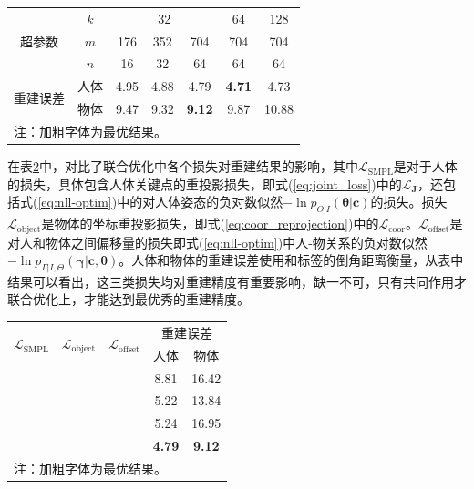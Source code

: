 \begin{table}[!htbp]
	\label{tab:ablation_representation}
	\centering
	\footnotesize
	\setlength{\tabcolsep}{4pt}
	\renewcommand{\arraystretch}{1.2}
	\begin{tabular}{c|c|ccc|c|c}
		\toprule
		\multirow{3}{*}{超参数} & $k$ & \multicolumn{3}{c|}{32} & 64 & 128 \\
		\cline{2-7}
		& $m$ & 176 & 352 & 704 & 704 & 704 \\
		& $n$ & 16 & 32 & 64 & 64 & 64 \\
		\hline
		\multirow{2}{*}{重建误差} & 人体 & 4.95 & 4.88 & 4.79 & \textbf{4.71} & 4.73 \\
		& 物体 & 9.47 & 9.32 & \textbf{9.12} & 9.87 & 10.88 \\
		\bottomrule
		\multicolumn{6}{l}{注：加粗字体为最优结果。}
	\end{tabular}
\end{table}

在表\ref{tab:ablation_loss}中，对比了联合优化中各个损失对重建结果的影响，其中$\mathcal{L}_{\text{SMPL}}$是对于人体的损失，具体包含人体关键点的重投影损失，即式(\ref{eq:joint_loss})中的$\mathcal{L}_{\mathbf{J}}$，还包括式(\ref{eq:nll-optim})中的对人体姿态的负对数似然$-\ln p_{\Theta|I}(\mathbf{\theta}|\mathbf{c})$的损失。损失$\mathcal{L}_{\text{object}}$是物体的坐标重投影损失，即式(\ref{eq:coor_reprojection})中的$\mathcal{L}_{\text{coor}}$。$\mathcal{L}_{\text{offset}}$是对人和物体之间偏移量的损失即式(\ref{eq:nll-optim})中人-物关系的负对数似然$ - \ln p_{\Gamma|I,\Theta}(\mathbf{\gamma}|\mathbf{c}, \mathbf{\theta})$。人体和物体的重建误差使用和标签的倒角距离衡量，从表中结果可以看出，这三类损失均对重建精度有重要影响，缺一不可，只有共同作用才联合优化上，才能达到最优秀的重建精度。

\begin{table}[!htbp]
	\label{tab:ablation_loss}
	\centering
	\footnotesize
	\setlength{\tabcolsep}{4pt}
	\renewcommand{\arraystretch}{1.2}
	\begin{tabular}{ccc|cc}
		\toprule
		\multirow{2}{*}{$\mathcal{L}_{\text{SMPL}}$} & \multirow{2}{*}{$\mathcal{L}_{\text{object}}$} & \multirow{2}{*}{$\mathcal{L}_{\text{offset}}$} & \multicolumn{2}{c}{重建误差} \\
		\cline{4-5}
		&&& 人体 & 物体 \\
		\hline
		\XSolidBrush & \Checkmark & \Checkmark & 8.81 & 16.42 \\
		\Checkmark & \XSolidBrush & \Checkmark & 5.22 & 13.84 \\
		\Checkmark & \Checkmark & \XSolidBrush & 5.24 & 16.95 \\
		\Checkmark & \Checkmark & \Checkmark & \textbf{4.79} & \textbf{9.12} \\
		\bottomrule
		\multicolumn{5}{l}{注：加粗字体为最优结果。}
	\end{tabular}
\end{table}

